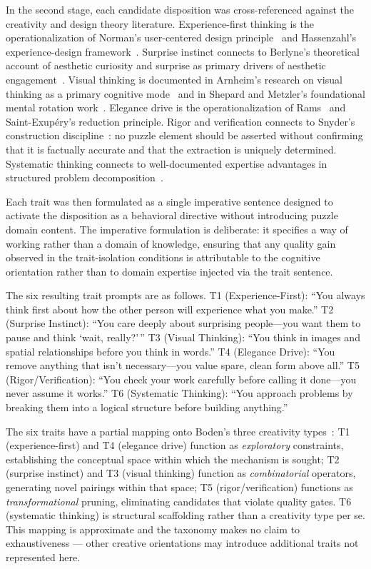 In the second stage, each candidate disposition was cross-referenced against the creativity and design theory literature. Experience-first thinking is the operationalization of Norman's user-centered design principle~\cite{norman2013design} and Hassenzahl's experience-design framework~\cite{hassenzahl2010experience}. Surprise instinct connects to Berlyne's theoretical account of aesthetic curiosity and surprise as primary drivers of aesthetic engagement~\cite{berlyne1971aesthetics}. Visual thinking is documented in Arnheim's research on visual thinking as a primary cognitive mode~\cite{arnheim1969visual} and in Shepard and Metzler's foundational mental rotation work~\cite{shepard1971mental}. Elegance drive is the operationalization of Rams~\cite{rams1976design} and Saint-Exup\'ery's reduction principle. Rigor and verification connects to Snyder's construction discipline~\cite{snyder2019craftsmanship}: no puzzle element should be asserted without confirming that it is factually accurate and that the extraction is uniquely determined. Systematic thinking connects to well-documented expertise advantages in structured problem decomposition~\cite{chi1981categorization}.

Each trait was then formulated as a single imperative sentence designed to activate the disposition as a behavioral directive without introducing puzzle domain content. The imperative formulation is deliberate: it specifies a way of working rather than a domain of knowledge, ensuring that any quality gain observed in the trait-isolation conditions is attributable to the cognitive orientation rather than to domain expertise injected via the trait sentence.

The six resulting trait prompts are as follows. T1 (Experience-First): ``You always think first about how the other person will experience what you make.'' T2 (Surprise Instinct): ``You care deeply about surprising people---you want them to pause and think `wait, really?'\,'' T3 (Visual Thinking): ``You think in images and spatial relationships before you think in words.'' T4 (Elegance Drive): ``You remove anything that isn't necessary---you value spare, clean form above all.'' T5 (Rigor/Verification): ``You check your work carefully before calling it done---you never assume it works.'' T6 (Systematic Thinking): ``You approach problems by breaking them into a logical structure before building anything.''

The six traits have a partial mapping onto Boden's three creativity types~\cite{boden2004creative}: T1 (experience-first) and T4 (elegance drive) function as \emph{exploratory} constraints, establishing the conceptual space within which the mechanism is sought; T2 (surprise instinct) and T3 (visual thinking) function as \emph{combinatorial} operators, generating novel pairings within that space; T5 (rigor/verification) functions as \emph{transformational} pruning, eliminating candidates that violate quality gates. T6 (systematic thinking) is structural scaffolding rather than a creativity type per se. This mapping is approximate and the taxonomy makes no claim to exhaustiveness --- other creative orientations may introduce additional traits not represented here.

